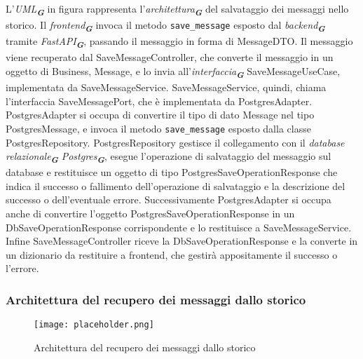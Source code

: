 L'\emph{UML}\textsubscript{\textbf{\textit{G}}} in figura rappresenta l'\emph{architettura}\textsubscript{\textbf{\textit{G}}} del salvataggio dei messaggi nello storico.
Il \emph{frontend}\textsubscript{\textbf{\textit{G}}} invoca il metodo \texttt{save\_message} esposto dal \emph{backend}\textsubscript{\textbf{\textit{G}}} tramite \emph{FastAPI}\textsubscript{\textbf{\textit{G}}}, passando il messaggio in forma di MessageDTO.
Il messaggio viene recuperato dal SaveMessageController, che converte il messaggio in un oggetto di Business, Message, e lo invia all'\emph{interfaccia}\textsubscript{\textbf{\textit{G}}} SaveMessageUseCase, implementata da SaveMessageService.
SaveMessageService, quindi, chiama l'interfaccia SaveMessagePort, che è implementata da PostgresAdapter.
PostgresAdapter si occupa di convertire il tipo di dato Message nel tipo PostgresMessage, e invoca il metodo \texttt{save\_message} esposto dalla classe PostgresRepository.
PostgresRepository gestisce il collegamento con il \emph{database relazionale}\textsubscript{\textbf{\textit{G}}} \emph{Postgres}\textsubscript{\textbf{\textit{G}}},
esegue l'operazione di salvataggio del messaggio sul database e restituisce un oggetto di tipo PostgresSaveOperationResponse che indica il successo o fallimento dell'operazione di salvataggio e la descrizione del successo o dell'eventuale errore.
Successivamente PostgresAdapter si occupa anche di convertire l'oggetto PostgresSaveOperationResponse in un DbSaveOperationResponse corrispondente e lo restituisce a SaveMessageService.
Infine SaveMessageController riceve la DbSaveOperationResponse e la converte in un dizionario da restituire a frontend, che gestirà appositamente il successo o l'errore.

\newpage


\subsubsection{Architettura del recupero dei messaggi dallo storico}
\label{sec:architettura_recupero_messaggi_storico}

\begin{figure}[h]
    \centering
    \texttt{[image: placeholder.png]}
    \caption{Architettura del recupero dei messaggi dallo storico}
\end{figure}

